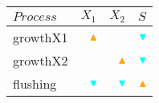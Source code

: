   \begin{tabular}{lrrr}\hline
    $Process$ & $X_1$ & $X_2$ & $S$ \\ \hline
    growthX1 & \textcolor{orange}{$\blacktriangle$} &  & \textcolor{cyan}{$\blacktriangledown$} \\
    growthX2 &  & \textcolor{orange}{$\blacktriangle$} & \textcolor{cyan}{$\blacktriangledown$} \\
    flushing & \textcolor{cyan}{$\blacktriangledown$} & \textcolor{cyan}{$\blacktriangledown$} & \textcolor{orange}{$\blacktriangle$} \\ \hline
  \end{tabular}

